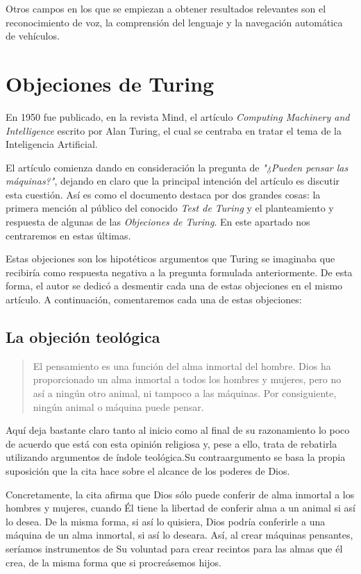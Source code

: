 \documentclass[12pt,a4paper]{article}
\begin{document}
Otros campos en los que se empiezan a obtener resultados relevantes son el reconocimiento de voz, la comprensión del lenguaje y la navegación automática de vehículos.

\section{Objeciones de Turing\cite{Turing}}
En 1950 fue publicado, en la revista Mind, el artículo \emph{Computing Machinery and Intelligence} escrito por Alan Turing, el cual se centraba en tratar el tema de la Inteligencia Artificial.

El artículo comienza dando en consideración la pregunta de \emph{"¿Pueden pensar las máquinas?"}, dejando en claro que la principal intención del artículo es discutir esta cuestión. Así es como el documento destaca por dos grandes cosas: la primera mención al público del conocido \emph{Test de Turing} y el planteamiento y respuesta de algunas de las \emph{Objeciones de Turing}. En este apartado nos centraremos en estas últimas.

Estas objeciones son los hipotéticos argumentos que Turing se imaginaba que recibiría como respuesta negativa a la pregunta formulada anteriormente. De esta forma, el autor se dedicó a desmentir cada una de estas objeciones en el mismo artículo. A continuación, comentaremos cada una de estas objeciones:

\subsection{La objeción teológica}

\begin{quote}\small El pensamiento es una función del alma inmortal del hombre. Dios ha proporcionado un alma inmortal a todos los hombres y mujeres, pero no así a ningún otro animal, ni tampoco a las máquinas. Por consiguiente, ningún animal o máquina puede pensar.\end{quote}

Aquí deja bastante claro tanto al inicio como al final de su razonamiento lo poco de acuerdo que está con esta opinión religiosa y, pese a ello, trata de rebatirla utilizando argumentos de índole teológica.Su contraargumento se basa la propia suposición que la cita hace sobre el alcance de los poderes de Dios.

Concretamente, la cita afirma que Dios sólo puede conferir de alma inmortal a los hombres y mujeres, cuando Él tiene la libertad de conferir alma a un animal si así lo desea. De la misma forma, si así lo quisiera, Dios podría conferirle a una máquina de un alma inmortal, si así lo deseara. Así, al crear máquinas pensantes, seríamos instrumentos de Su voluntad para crear recintos para las almas que él crea, de la misma forma que si procreásemos hijos.
\end{document}

